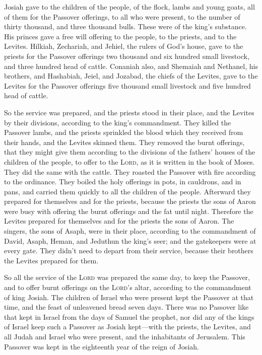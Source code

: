  Josiah gave to the children of the people, of the flock,
lambs and young goats, all of them for the Passover offerings, to all
who were present, to the number of thirty thousand, and three thousand
bulls. These were of the king's substance.  His princes
gave a free will offering to the people, to the priests, and to the
Levites. Hilkiah, Zechariah, and Jehiel, the rulers of God's house, gave
to the priests for the Passover offerings two thousand and six hundred
small livestock, and three hundred head of cattle. 
Conaniah also, and Shemaiah and Nethanel, his brothers, and Hashabiah,
Jeiel, and Jozabad, the chiefs of the Levites, gave to the Levites for
the Passover offerings five thousand small livestock and five hundred
head of cattle.

 So the service was prepared, and the priests stood in
their place, and the Levites by their divisions, according to the king's
commandment.  They killed the Passover lambs, and the
priests sprinkled the blood which they received from their hands, and
the Levites skinned them.  They removed the burnt
offerings, that they might give them according to the divisions of the
fathers' houses of the children of the people, to offer to the
\textsc{Lord}, as it is written in the book of Moses. They did the same
with the cattle.  They roasted the Passover with fire
according to the ordinance. They boiled the holy offerings in pots, in
cauldrons, and in pans, and carried them quickly to all the children of
the people.  Afterward they prepared for themselves and
for the priests, because the priests the sons of Aaron were busy with
offering the burnt offerings and the fat until night. Therefore the
Levites prepared for themselves and for the priests the sons of Aaron.
 The singers, the sons of Asaph, were in their place,
according to the commandment of David, Asaph, Heman, and Jeduthun the
king's seer; and the gatekeepers were at every gate. They didn't need to
depart from their service, because their brothers the Levites prepared
for them.

 So all the service of the \textsc{Lord} was prepared the
same day, to keep the Passover, and to offer burnt offerings on the
\textsc{Lord}'s altar, according to the commandment of king Josiah.
 The children of Israel who were present kept the
Passover at that time, and the feast of unleavened bread seven days.
 There was no Passover like that kept in Israel from the
days of Samuel the prophet, nor did any of the kings of Israel keep such
a Passover as Josiah kept---with the priests, the Levites, and all Judah
and Israel who were present, and the inhabitants of Jerusalem.
 This Passover was kept in the eighteenth year of the
reign of Josiah.

